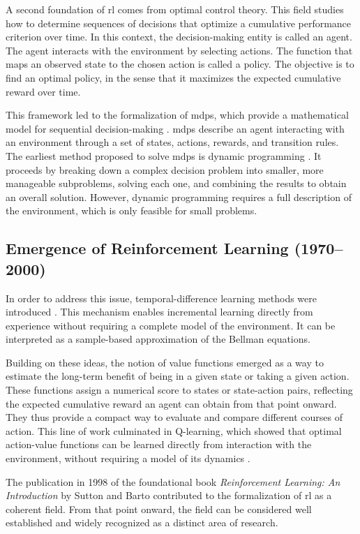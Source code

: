 A second foundation of \gls{rl} comes from optimal control theory.
This field studies how to determine sequences of decisions that optimize a cumulative performance criterion over time.
In this context, the decision-making entity is called an agent.  
The agent interacts with the environment by selecting actions.  
The function that maps an observed state to the chosen action is called a policy.
The objective is to find an optimal policy, in the sense that it maximizes the expected cumulative reward over time.

This framework led to the formalization of \glspl{mdp}, which provide a mathematical model for sequential decision-making \parencite{howard1960mdp}.
\glspl{mdp} describe an agent interacting with an environment through a set of states, actions, rewards, and transition rules.
The earliest method proposed to solve \glspl{mdp} is dynamic programming \parencite{bellman1957dynamic}.
It proceeds by breaking down a complex decision problem into smaller, more manageable subproblems, solving each one, and combining the results to obtain an overall solution.
However, dynamic programming requires a full description of the environment, which is only feasible for small problems.

\subsection{Emergence of Reinforcement Learning (1970--2000)}

In order to address this issue, temporal-difference learning methods were introduced \parencite{sutton1988td}.  
This mechanism enables incremental learning directly from experience without requiring a complete model of the environment.  
It can be interpreted as a sample-based approximation of the Bellman equations.  

Building on these ideas, the notion of value functions emerged as a way to estimate the long-term benefit of being in a given state or taking a given action.
These functions assign a numerical score to states or state-action pairs, reflecting the expected cumulative reward an agent can obtain from that point onward.
They thus provide a compact way to evaluate and compare different courses of action.
This line of work culminated in Q-learning, which showed that optimal action-value functions can be learned directly from interaction with the environment, without requiring a model of its dynamics \parencite{watkins1989qlearning,watkins1992qlearning}. 

The publication in 1998 of the foundational book \textit{Reinforcement Learning: An Introduction} by Sutton and Barto \parencite{suttonbarto1998} contributed to the formalization of \gls{rl} as a coherent field.
From that point onward, the field can be considered well established and widely recognized as a distinct area of research.

